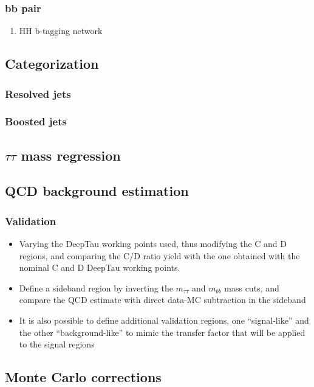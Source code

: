 \documentclass[11pt]{article}
\begin{document}
\subsubsection{bb pair}
\label{sec:org553edee}
\begin{enumerate}
\item HH b-tagging network
\label{sec:orgdaf6efc}
\end{enumerate}
\subsection{Categorization}
\label{sec:orgaae8baa}
\label{sec:categorization}
\subsubsection{Resolved jets}
\label{sec:org38ce2a6}
\subsubsection{Boosted jets}
\label{sec:org4264d77}
\subsection{\(\tau \tau\) mass regression}
\label{sec:org0df521e}
\subsection{QCD background estimation}
\label{sec:org2c991b7}
\subsubsection{Validation}
\label{sec:org9538d05}
\begin{itemize}
\item Varying the DeepTau working points used, thus modifying the C and D regions, and comparing the C/D ratio yield with the one obtained with the nominal C and D DeepTau working points.
\item Define a sideband region by inverting the \(m_{\tau\tau}\) and \(m_{bb}\) mass cuts, and compare the QCD estimate with direct data-MC subtraction in the sideband
\item It is also possible to define additional validation regions, one ``signal-like'' and the other ``background-like'' to mimic the transfer factor that will be applied to the signal regions
\end{itemize}
\subsection{Monte Carlo corrections}
\label{sec:org002e1d5}
\end{document}
